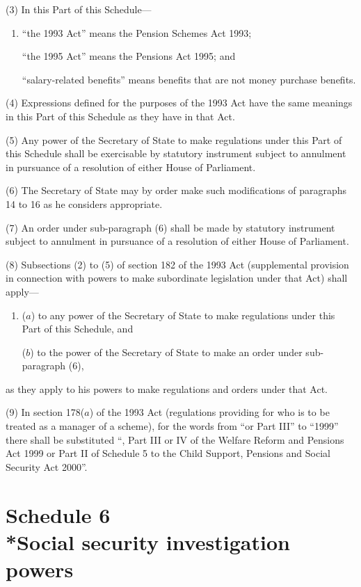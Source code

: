 \documentclass[12pt,a4paper]{article}
\begin{document}
(3) In this Part of this Schedule—
\begin{enumerate}\item[]
    “the 1993 Act” means the Pension Schemes Act 1993;

    “the 1995 Act” means the Pensions Act 1995; and

    “salary-related benefits” means benefits that are not money purchase benefits. 
\end{enumerate}

(4) Expressions defined for the purposes of the 1993 Act have the same meanings in this Part of this Schedule as they have in that Act.

(5) Any power of the Secretary of State to make regulations under this Part of this Schedule shall be exercisable by statutory instrument subject to annulment in pursuance of a resolution of either House of Parliament.

(6) The Secretary of State may by order make such modifications of paragraphs 14 to 16 as he considers appropriate.

(7) An order under sub-paragraph (6)  shall be made by statutory instrument subject to annulment in pursuance of a resolution of either House of Parliament.

(8) Subsections (2)  to (5)  of section 182 of the 1993 Act (supplemental provision in connection with powers to make subordinate legislation under that Act) shall apply—
\begin{enumerate}\item[]
($a$) to any power of the Secretary of State to make regulations under this Part of this Schedule, and

($b$) to the power of the Secretary of State to make an order under sub-paragraph (6),
\end{enumerate}
as they apply to his powers to make regulations and orders under that Act.

(9) In section 178($a$)  of the 1993 Act (regulations providing for who is to be treated as a manager of a scheme), for the words from “or Part III” to “1999” there shall be substituted “, Part III or IV of the Welfare Reform and Pensions Act 1999 or Part II of Schedule 5 to the Child Support, Pensions and Social Security Act 2000”. 

\part[Schedule 6 --- Social security investigation powers]{Schedule 6\\*Social security investigation powers}
\end{document}
